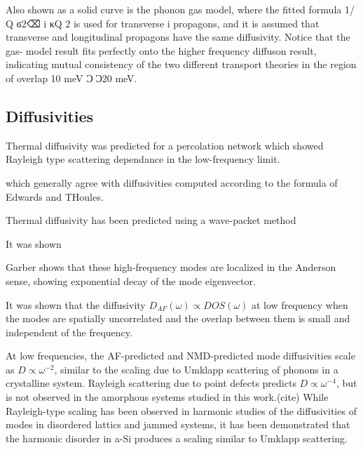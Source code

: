 \documentclass[aps,prb,twocolumn,superscriptaddress,footinbib,amsmath,amssymb,floatfix]{revtex4}
\begin{document}
Also
shown as a solid curve is the phonon gas model, where the
fitted formula 1/␶ Q ϭ2⌫ i κQ 2
is used for transverse
i
propagons, and it is assumed that transverse and longitudinal
propagons have the same diffusivity. Notice that the gas-
model result fits perfectly onto the higher frequency diffuson
result, indicating mutual consistency of the two different
transport theories in the region of overlap 10 meV Ͻ␻Ͻ20
meV.

\subsection{\label{S:Diffusivities}Diffusivities}


Thermal diffusivity was predicted for a percolation network which showed 
Rayleigh type scattering dependance in the low-frequency limit.
\cite{sheng_heat_1991}

which generally agree with diffusivities computed according to the 
formula of Edwards and THoules.\cite{edwards_numerical_1972,
feldman_numerical_1999,beltukov_ioffe-regel_2013}

Thermal diffusivity has been predicted using a wave-packet method

It was shown 

Garber shows that these high-frequency modes are localized in the 
Anderson sense, showing exponential decay of the mode eigenvector.
\cite{garber_numerical_2001}

It was shown that the diffusivity $D_{AF}(\omega) \propto DOS(\omega)$ 
at low frequency when the modes are spatially uncorrelated and the 
overlap between them is small and independent of the frequency.
\cite{vitelli_heat_2010,xu_energy_2009}

At low frequencies, the AF-predicted and NMD-predicted mode 
diffusivities scale as $D \propto \omega^{-2}$, similar to the scaling 
due to Umklapp scattering of phonons in a crystalline system. Rayleigh 
scattering due to point defects predicts $D \propto \omega^{-4}$, 
but is not observed in the amorphous systems studied in this work.(cite) 
While Rayleigh-type scaling has been 
observed in harmonic studies of the diffusivities of modes in 
disordered lattics and jammed systems,
\cite{sheng_heat_1991,xu_energy_2009,vitelli_heat_2010} 
it has been demonstrated that the harmonic disorder in a-Si 
produces a scaling similar to Umklapp scattering.
\cite{feldman_thermal_1993}
\end{document}
